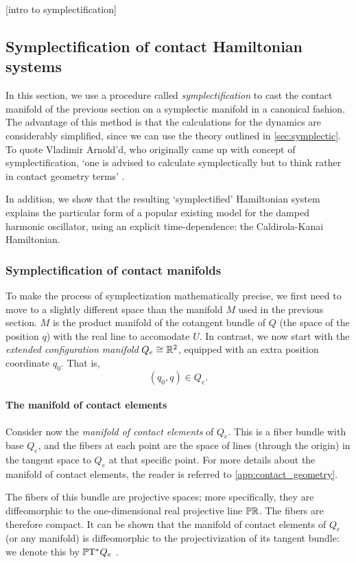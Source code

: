 [intro to symplectification]

\subsection{Symplectification of contact Hamiltonian systems}
\label{ssec:symplectification}
In this section, we use a procedure called \emph{symplectification} to cast the contact manifold of the previous section on a symplectic manifold in a canonical fashion. The advantage of this method is that the calculations for the dynamics are considerably simplified, since we can use the theory outlined in \cref{sec:symplectic}. To quote Vladimir Arnold'd, who originally came up with concept of symplectification, `one is advised to calculate symplectically but to think rather in contact geometry terms’ \cite{VanderSchaft2021a,Arnold1989a}.

In addition, we show that the resulting `symplectified' Hamiltonian system explains the particular form of a popular existing model for the damped harmonic oscillator, using an explicit time-dependence: the Caldirola-Kanai Hamiltonian.

\subsubsection{Symplectification of contact manifolds}
To make the process of symplectization mathematically precise, we first need to move to a slightly different space than the manifold $M$ used in the previous section. $M$ is the product manifold of the cotangent bundle of $Q$ (the space of the position $q$) with the real line to accomodate $U$. In contrast, we now start with the \emph{extended configuration manifold} $Q_e \cong \mathbb{R}^2$, equipped with an extra position coordinate $q_0$. That is,
$$ (q_0, q) \in Q_e. $$

\paragraph{The manifold of contact elements} Consider now the \emph{manifold of contact elements} of $Q_e$. This is a fiber bundle with base $Q_e$, and the fibers at each point are the space of lines (through the origin) in the tangent space to $Q_e$ at that specific point. For more details about the manifold of contact elements, the reader is referred to \cref{app:contact_geometry}.

The fibers of this bundle are projective spaces; more specifically, they are diffeomorphic to the one-dimensional real projective line $\mathbb{P}\mathbb{R}$. The fibers are therefore compact. It can be shown that the manifold of contact elements of $Q_e$ (or any manifold) is diffeomorphic to the projectivization of its tangent bundle: we denote this by $\mathbb{P}\mathrm{T}^* Q_e$ \cite{Cannas2001,Arnold1989,Libermann1987}.

